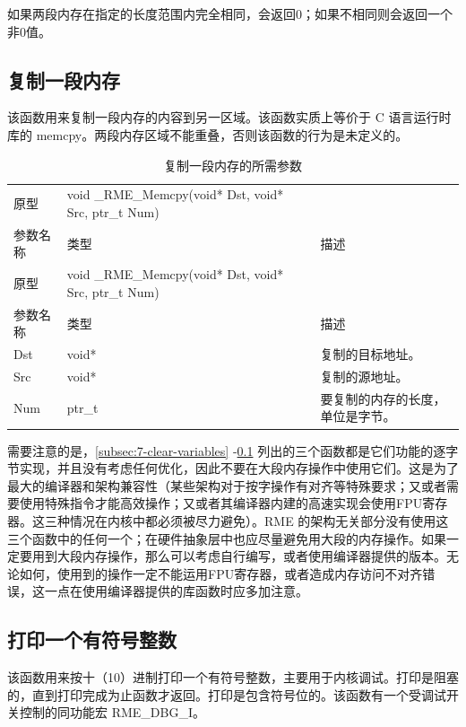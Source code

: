 如果两段内存在指定的长度范围内完全相同，会返回0；如果不相同则会返回一个非0值。

\subsection{复制一段内存}\label{subsec:7-copy-memory-block}

该函数用来复制一段内存的内容到另一区域。该函数实质上等价于 C 语言运行时库的 memcpy。两段内存区域不能重叠，否则该函数的行为是未定义的。

\begin{xltabular}{\textwidth}{@{}>{\hsize\raggedright\arraybackslash}X>{\hsize\raggedright\arraybackslash}X>{\hsize\raggedright\arraybackslash}X@{}}
\caption{复制一段内存的所需参数}\label{tab:7-87-copy-memory-block-parameters}\\
\toprule
原型 & void \_RME\_Memcpy(void* Dst, void* Src, ptr\_t Num)
&\tabularnewline
参数名称 & 类型 & 描述\tabularnewline
\endfirsthead
\toprule
原型 & void \_RME\_Memcpy(void* Dst, void* Src, ptr\_t Num)
&\tabularnewline
参数名称 & 类型 & 描述\tabularnewline
\midrule
\endhead
\bottomrule
\endlastfoot
Dst & void* & 复制的目标地址。\tabularnewline
Src & void* & 复制的源地址。\tabularnewline
Num & ptr\_t & 要复制的内存的长度，单位是字节。\tabularnewline
\end{xltabular}

需要注意的是，\ref{subsec:7-clear-variables}
-\ref{subsec:7-copy-memory-block}
列出的三个函数都是它们功能的逐字节实现，并且没有考虑任何优化，因此不要在大段内存操作中使用它们。这是为了最大的编译器和架构兼容性（某些架构对于按字操作有对齐等特殊要求；又或者需要使用特殊指令才能高效操作；又或者其编译器内建的高速实现会使用FPU寄存器。这三种情况在内核中都必须被尽力避免）。RME 的架构无关部分没有使用这三个函数中的任何一个；在硬件抽象层中也应尽量避免用大段的内存操作。如果一定要用到大段内存操作，那么可以考虑自行编写，或者使用编译器提供的版本。无论如何，使用到的操作一定不能运用FPU寄存器，或者造成内存访问不对齐错误，这一点在使用编译器提供的库函数时应多加注意。

\subsection{打印一个有符号整数}\label{subsec:7-print-signed-integer}

该函数用来按十（10）进制打印一个有符号整数，主要用于内核调试。打印是阻塞的，直到打印完成为止函数才返回。打印是包含符号位的。该函数有一个受调试开关控制的同功能宏 RME\_DBG\_I。

